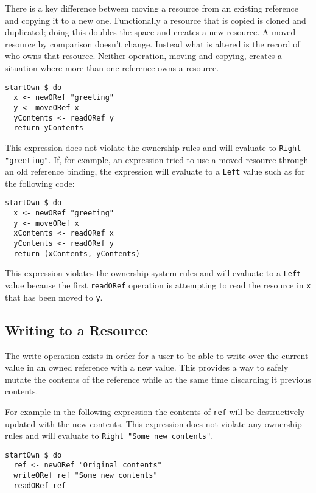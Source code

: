 \documentclass[onehalf,11pt]{beavtex}
\begin{document}
There is a key difference between moving a resource from an existing reference
and copying it to a new one.  Functionally a resource that is copied is cloned
and duplicated; doing this doubles the space and creates a new resource.
A moved resource by comparison doesn't change.  Instead what is altered is the
record of who owns that resource.  Neither operation, moving and copying,
creates a situation where more than one reference owns a resource.

\begin{lstlisting}
startOwn $ do
  x <- newORef "greeting"
  y <- moveORef x
  yContents <- readORef y
  return yContents
\end{lstlisting}

This expression does not violate the ownership rules and will evaluate
to \texttt{Right "greeting"}.
If, for example, an expression tried to use a moved resource through an
old reference binding, the expression will evaluate to a \texttt{Left} value
such as for the following code:

\begin{lstlisting}
startOwn $ do
  x <- newORef "greeting"
  y <- moveORef x
  xContents <- readORef x
  yContents <- readORef y
  return (xContents, yContents)
\end{lstlisting}

This expression violates the ownership system rules and will evaluate to
a \texttt{Left} value because the first \texttt{readORef} operation is
attempting to read the resource in \texttt{x} that has been moved to \texttt{y}.


\subsection{Writing to a Resource}

The write operation exists in order for a user to be able to write over the
current value in an owned reference with a new value. This provides a way to
safely mutate the contents of the reference while at the same time discarding
it previous contents.

For example in the following expression the contents of \texttt{ref}
will be destructively updated with the new contents. This expression does
not violate any ownership rules and will evaluate
to \texttt{Right "Some new contents"}. 

\begin{lstlisting}
startOwn $ do
  ref <- newORef "Original contents"
  writeORef ref "Some new contents"
  readORef ref
\end{lstlisting}
\end{document}

